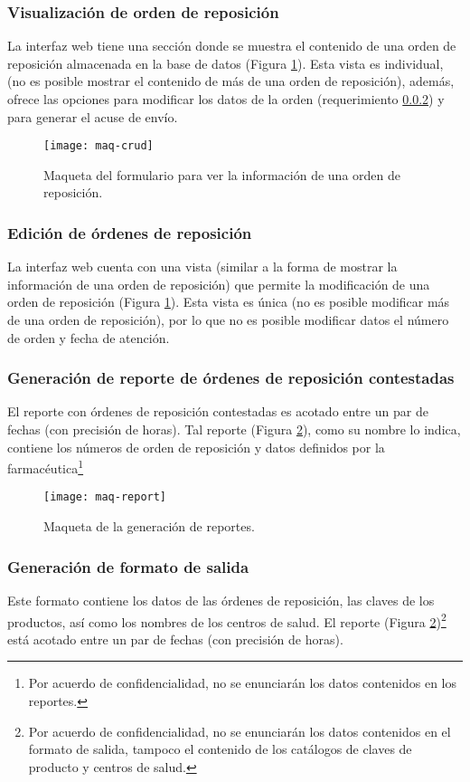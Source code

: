 \subsubsection{Visualización de orden de reposición}\label{sec:req-show}
La interfaz web tiene una sección donde se muestra el contenido de una orden de reposición almacenada en la base de datos (Figura \ref{fig:maq-crud}). Esta vista es individual, (no es posible mostrar el contenido de más de una orden de reposición), además, ofrece las opciones para modificar los datos de la orden (requerimiento \ref{sec:req-update}) y para generar el acuse de envío.

\pagebreak

\begin{figure}[h]
  \centering
  \texttt{[image: maq-crud]} 
  \caption{Maqueta del formulario para ver la información de una orden de reposición.}
  \label{fig:maq-crud}
\end{figure} 

\subsubsection{Edición de órdenes de reposición}\label{sec:req-update}
La interfaz web cuenta con una vista (similar a la forma de mostrar la información de una orden de reposición) que permite la modificación de una orden de reposición (Figura \ref{fig:maq-crud}). Esta vista es única (no es posible modificar más de una orden de reposición), por lo que no es posible modificar datos el número de orden y fecha de atención.

\subsubsection{Generación de reporte de órdenes de reposición contestadas}\label{sec:req-rep-contestadas}
El reporte con órdenes de reposición contestadas es acotado entre un par de fechas (con precisión de horas). Tal reporte (Figura \ref{fig:maq-report}), como su nombre lo indica, contiene los números de orden de reposición y datos definidos por la farmacéutica\footnote{Por acuerdo de confidencialidad, no se enunciarán los datos contenidos en los reportes.}
\begin{figure}[h]
  \centering
  \texttt{[image: maq-report]} 
  \caption{Maqueta de la generación de reportes.}
  \label{fig:maq-report}
\end{figure} 

\subsubsection{Generación de formato de salida}\label{sec:req-rep-layout}
Este formato contiene los datos de las órdenes de reposición, las claves de los productos, así como los nombres de los centros de salud. El reporte (Figura \ref{fig:maq-report})\footnote{Por acuerdo de confidencialidad, no se enunciarán los datos contenidos en el formato de salida, tampoco el contenido de los catálogos de claves de producto y centros de salud.} está acotado entre un par de fechas (con precisión de horas).

